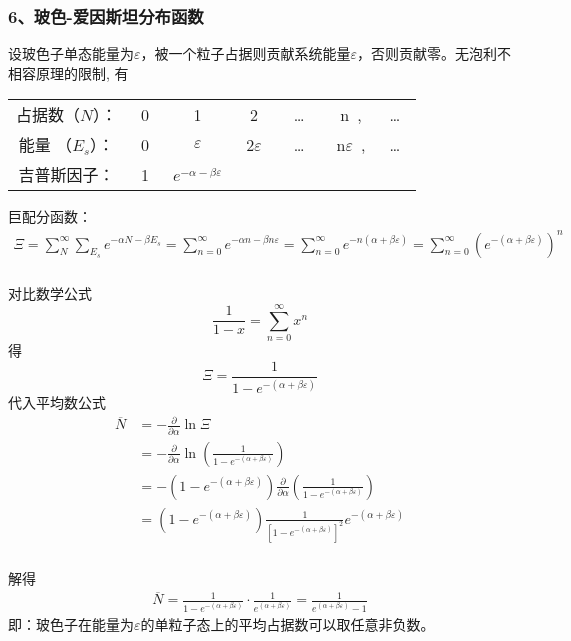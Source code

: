 \begin{frame}
  \frametitle{6、玻色-爱因斯坦分布函数}
  \解 设玻色子单态能量为$\varepsilon$，被一个粒子占据则贡献系统能量$\varepsilon$，否则贡献零。无泡利不相容原理的限制, 有
\begin{table}[htbp]
  \centering\begin{tabular}{ccccccc}
    占据数（$N$）： & ~0~ & ~1~& ~2~ & ~\dots~ & ~n~, & ~\dots~\\
    能量 （$E_s$）： &  0 & $\varepsilon$& ~2$\varepsilon$~ & ~\dots~ & ~n$\varepsilon$~, & ~\dots~\\
    吉普斯因子： & 1 & $e^{-\alpha -\beta \varepsilon } $ &&&& \\ 
  \end{tabular}
\end{table}
巨配分函数：$$ 
\begin{aligned}
  \Xi = \sum_{N} ^\infty \sum_{E_s} e^{-\alpha N -\beta E_s}  
  = \sum_{n=0}^\infty e^{-\alpha n -\beta n \varepsilon }  
  = \sum_{n=0}^\infty e^{-n(\alpha +\beta \varepsilon)} 
  = \sum_{n=0}^\infty \left(e^{-(\alpha +\beta \varepsilon)}\right)^n 
\end{aligned}
$$ 
\end{frame} 

\begin{frame}
  \frametitle{}
对比数学公式
\[ \frac{1}{1-x} = \sum_{n=0}^{\infty} x^n\]
得
\[ \Xi = \frac{1}{1-e^{-(\alpha +\beta \varepsilon)}}\]
代入平均数公式
\[
\begin{aligned}
\overline{N} &= - \frac{\partial }{\partial \alpha } \ln \Xi \\
&= - \frac{\partial }{\partial \alpha } \ln (\frac{1}{1-e^{-(\alpha +\beta \varepsilon)}}) \\
&= - (1-e^{-(\alpha +\beta \varepsilon)})\frac{\partial }{\partial \alpha }  (\frac{1}{1-e^{-(\alpha +\beta \varepsilon)}}) \\
&= (1-e^{-(\alpha +\beta \varepsilon)}) \frac{1}{[1-e^{-(\alpha +\beta \varepsilon)}]^2} e^{-(\alpha +\beta \varepsilon)}
\end{aligned} 
  \]
\end{frame} 

\begin{frame}
  \frametitle{}
  解得
  \[
    \begin{aligned}
    \overline{N} 
    =\frac{1}{1-e^{-(\alpha +\beta \varepsilon)}} \cdot \frac{1}{e^{(\alpha +\beta \varepsilon)}}= \frac{1}{e^{(\alpha +\beta \varepsilon)}-1}
    \end{aligned} 
      \]
即：玻色子在能量为$\varepsilon$的单粒子态上的平均占据数可以取任意非负数。
\end{frame} 

